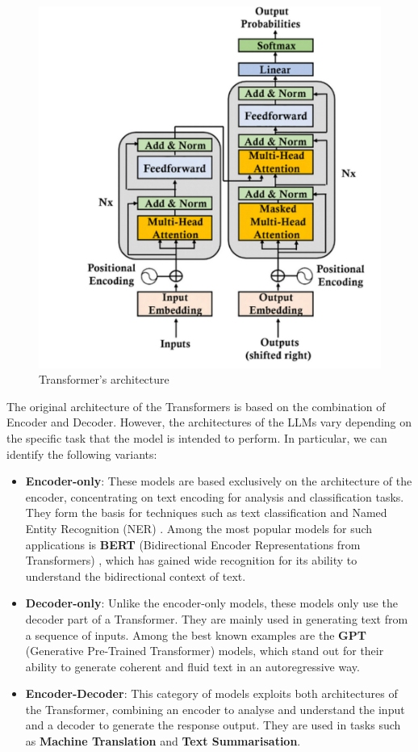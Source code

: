 \begin{figure}[h]
    \centering
    \includegraphics[width=0.7\linewidth]{Figures/Transformer.png}
    \caption{Transformer's architecture}
    \label{fig:graph}
\end{figure}
The original architecture of the Transformers is based on the combination of Encoder and Decoder. However, the architectures of the LLMs vary depending on the specific task that the model is intended to perform.
In particular, we can identify the following variants:\\
\begin{itemize}
    \item \textbf{Encoder-only}: These models are based exclusively on the architecture of the encoder, concentrating on text encoding for analysis and classification tasks. They form the basis for techniques such as text classification \cite{TextClassification} and Named Entity Recognition (NER) \cite{Ner}. Among the most popular models for such applications is \textbf{BERT} (Bidirectional Encoder Representations from Transformers) \cite{Bert}, which has gained wide recognition for its ability to understand the bidirectional context of text.
    \item \textbf{Decoder-only}:  Unlike the encoder-only models, these models only use the decoder part of a Transformer. They are mainly used in generating text from a sequence of inputs.  Among the best known examples are the \textbf{GPT} (Generative Pre-Trained Transformer) models, which stand out for their ability to generate coherent and fluid text in an autoregressive way.
    \item \textbf{Encoder-Decoder}: This category of models exploits both architectures of the Transformer, combining an encoder to analyse and understand the input and a decoder to generate the response output. They are used in tasks such as \textbf{Machine Translation} and \textbf{Text Summarisation}.
\end{itemize}
